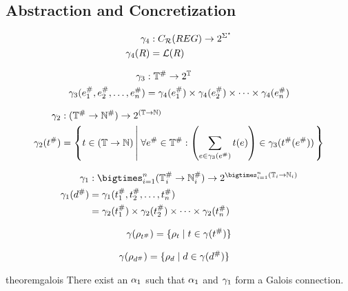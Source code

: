 \subsection{Abstraction and Concretization}\label{subsec:abstraction-and-concretization}

\begin{align}
    \gamma_4 &: C_{\mathcal{R}}(REG) \rightarrow 2^{\Sigma^\star} \\
    \gamma_4(R) &= \mathcal{L}(R)
\end{align}

\begin{align}
    \gamma_3 &: \mathbb{T}^\# \rightarrow 2^\mathbb{T} \\
    \gamma_3 (e_1^\#, e_2^\#, \dots, e_n^\#) &= \gamma_4(e_1^\#) \times \gamma_4(e_2^\#) \times \dots \times \gamma_4(e_n^\#)
\end{align}

\begin{align}
    \gamma_2 &: (\mathbb{T}^\# \rightarrow \mathbb{N}^\#) \rightarrow 2^{(\mathbb{T} \rightarrow \mathbb{N})} \\
    \gamma_2 (t^\#) &= \left\{ t \in (\mathbb{T} \rightarrow \mathbb{N}) \left|\; \forall e^\# \in \mathbb{T}^\# : \left( \sum_{e \in \gamma_3(e^\#)} t(e) \right) \in \gamma_3(t^\#(e^\#))\right. \right\}
\end{align}

\begin{align}
    \concrete_1 &: \bigtimes_{i = 1}^{n} (\mathbb{T}^\#_i \rightarrow \mathbb{N}^\#_i) \rightarrow 2^{\bigtimes_{i = 1}^{n} (\mathbb{T}_i \rightarrow \mathbb{N}_i)} \\
    \concrete_1(d^\#) &= \concrete_1(t_1^\#, t_2^\#, \dots, t_n^\#) \\
                    &= \concrete_2(t_1^\#) \times \concrete_2(t_2^\#) \times \dots \times \concrete_2(t_n^\#)
\end{align}

\begin{align}
    \gamma(\rho_{t^\#}) = \{ \rho_{t} \mid t \in \gamma(t^\#) \}
\end{align}

\begin{align}
    \gamma(\rho_{d^\#}) &= \{ \rho_{d} \mid d \in \gamma(d^\#) \}
\end{align}

\begin{restatable}{theorem}{galois}\label{thm:galios}
    There exist an $\alpha_1$ such that $\alpha_1$ and $\gamma_1$ form a Galois connection.
\end{restatable}

